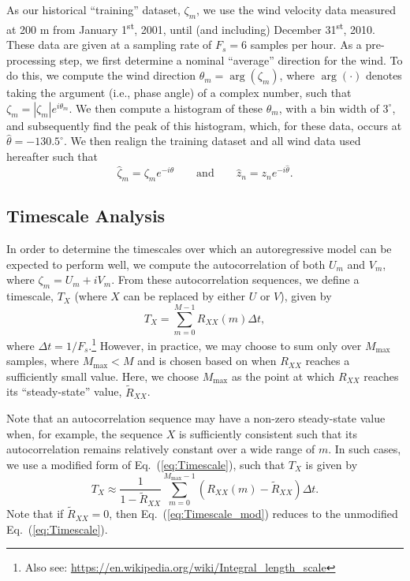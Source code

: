 \documentclass[11pt, oneside]{article}
\newcommand{\eqnref}[1]{Eq.~(\ref{#1})}
\begin{document}
As our historical ``training'' dataset, $\zeta_m$, we use the wind velocity data measured at 200 m from January 1\textsuperscript{st}, 2001, until (and including) December 31\textsuperscript{st}, 2010.
These data are given at a sampling rate of $F_s = 6$ samples per hour.
As a pre-processing step, we first determine a nominal ``average'' direction for the wind.
To do this, we compute the wind direction $\theta_m = \arg (\zeta_m)$, where $\arg ( \cdot )$ denotes taking the argument (i.e., phase angle) of a complex number, such that $\zeta_m = |\zeta_m| e^{i \theta_m}$.
We then compute a histogram of these $\theta_m$, with a bin width of $3^\circ$, and subsequently find the peak of this histogram, which, for these data, occurs at $\hat{\theta} = -130.5^\circ$. %
We then realign the training dataset and all wind data used hereafter such that
\begin{equation}
\hat{\zeta}_m = \zeta_m e^{-i\hat{\theta}}
\quad\quad \text{and} \quad\quad
\hat{z}_n = z_n e^{-i\hat{\theta}}.
\end{equation}

\subsection{Timescale Analysis}\label{sec:Methodology:Timescale}
In order to determine the timescales over which an autoregressive model can be expected to perform well, we compute the autocorrelation of both $U_m$ and $V_m$, where $\zeta_m = U_m + i V_m$.
From these autocorrelation sequences, we define a timescale, $T_X$ (where $X$ can be replaced by either $U$ or $V$), given by \citep{ONeill2004}
\begin{equation}\label{eq:Timescale}
T_X = \sum_{m = 0}^{M-1} R_{XX}(m) \Delta t,
\end{equation}
where $\Delta t = 1/F_s$.\footnote{Also see: \url{https://en.wikipedia.org/wiki/Integral_length_scale}}
However, in practice, we may choose to sum only over $M_\text{max}$ samples, where $M_\text{max} < M$ and is chosen based on when $R_{XX}$ reaches a sufficiently small value.
Here, we choose $M_\text{max}$ as the point at which $R_{XX}$ reaches its ``steady-state'' value, $\tilde{R}_{XX}$.

Note that an autocorrelation sequence may have a non-zero steady-state value when, for example, the sequence $X$ is sufficiently consistent such that its autocorrelation remains relatively constant over a wide range of $m$.
In such cases, we use a modified form of \eqnref{eq:Timescale}, such that $T_X$ is given by
\begin{equation}\label{eq:Timescale_mod}
T_X \approx \frac{1}{1 - \tilde{R}_{XX}} \sum_{m = 0}^{M_\text{max}-1} (R_{XX}(m) - \tilde{R}_{XX}) \Delta t.
\end{equation}
Note that if $\tilde{R}_{XX} = 0$, then \eqnref{eq:Timescale_mod} reduces to the unmodified \eqnref{eq:Timescale}.
\end{document}
